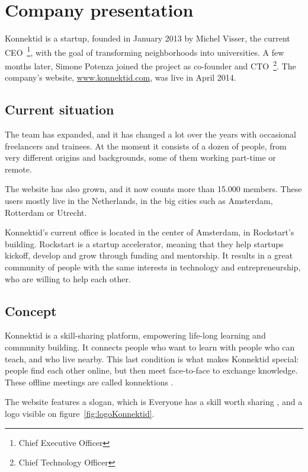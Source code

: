 \section{Company presentation}
\label{sec:company}

Konnektid is a startup, founded in January 2013 by Michel {\sc Visser}, the current CEO~\footnote{Chief Executive Officer},
with the goal of transforming neighborhoods into universities. A few months later, Simone {\sc Potenza} joined the project
as co-founder and CTO~\footnote{Chief Technology Officer}. The company's website, \url{www.konnektid.com}, was live in April 2014.

\subsection{Current situation}
\label{ssec:situation}

The team has expanded, and it has changed a lot over the years with occasional freelancers and trainees.
At the moment it consists of a dozen of people, from very different origins and backgrounds, some of them working part-time or remote.

The website has also grown, and it now counts more than 15.000 members.
These users mostly live in the Netherlands, in the big cities such as Amsterdam, Rotterdam or Utrecht.

Konnektid's current office is located in the center of Amsterdam, in Rockstart's building.
Rockstart is a startup accelerator, meaning that they help startups kickoff, develop and grow through funding and mentorship.
It results in a great community of people with the same interests in technology and entrepreneurship, who are willing to help each other.

\subsection{Concept}
\label{ssec:concept}

Konnektid is a skill-sharing platform, empowering life-long learning and community building. It connects people who want to learn with people who can teach, and who live nearby.
This last condition is what makes Konnektid special: people find each other online, but then meet face-to-face to exchange knowledge.
These offline meetings are called \guillemotleft{} konnektions \guillemotright{}.

The website features a slogan, which is \guillemotleft{} Everyone has a skill worth sharing \guillemotright{},
and a logo visible on {\sc figure}~\ref{fig:logoKonnektid}.
\vspace{1cm}

